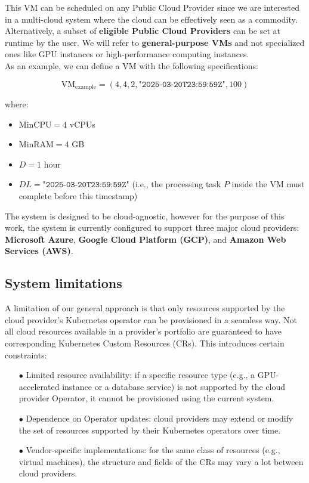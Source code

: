 This VM can be scheduled on any Public Cloud Provider since we are interested in a multi-cloud system where the cloud can be effectively seen as a commodity. 
Alternatively, a subset of \textbf{eligible Public Cloud Providers} can be set at runtime by the user.
We will refer to \textbf{general-purpose VMs} and not specialized ones like GPU instances or high-performance computing instances. \\

As an example, we can define a VM with the following specifications:

\[
\text{VM}_{\text{example}} = (4, 4, 2, \texttt{"2025-03-20T23:59:59Z"}, 100)
\]


where:
\begin{itemize}[itemsep=0.2pt, topsep=1pt]
    \item \( \text{MinCPU} = 4 \) vCPUs
    \item \( \text{MinRAM} = 4 \) GB
    \item \( D = 1 \) hour
    \item \( DL = \texttt{"2025-03-20T23:59:59Z"} \) (i.e., the processing task \( P \) inside the VM must complete before this timestamp) \\
\end{itemize}

The system is designed to be cloud-agnostic, however for the purpose of this work, the system is currently configured to support three major cloud providers: \textbf{Microsoft Azure}, \textbf{Google Cloud Platform (GCP)}, and \textbf{Amazon Web Services (AWS)}.

\subsection{System limitations}

A limitation of our general approach is that only resources supported by the cloud provider’s Kubernetes operator can be provisioned in a 
seamless way.
Not all cloud resources available in a provider’s portfolio are guaranteed to have corresponding Kubernetes Custom Resources (CRs). This introduces certain constraints:

\begin{itemize}[itemsep=0.2pt, topsep=1pt]
  \item[$\bullet$] Limited resource availability: if a specific resource type (e.g., a GPU-accelerated instance or a database service) is not supported by the cloud provider Operator, it cannot be provisioned using the current system.
  \item[$\bullet$] Dependence on Operator updates: cloud providers may extend or modify the set of resources supported by their Kubernetes operators over time.
  \item[$\bullet$] Vendor-specific implementations: for the same class of resources (e.g., virtual machines), the structure and fields of the CRs may vary a lot between cloud providers.
\end{itemize}

